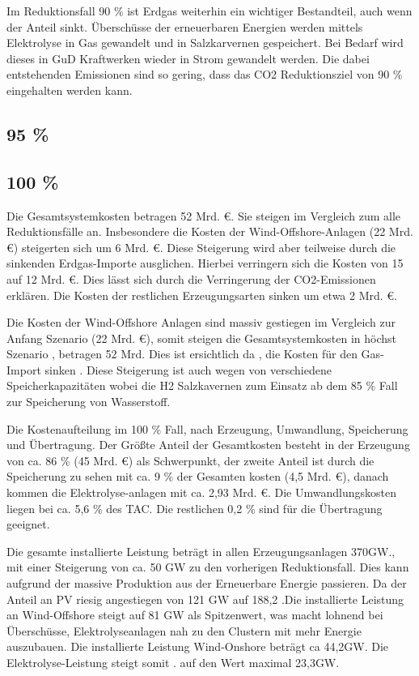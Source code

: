 Im Reduktionsfall 90 \% ist Erdgas weiterhin ein wichtiger Bestandteil, auch wenn der Anteil sinkt. Überschüsse der erneuerbaren Energien werden mittels Elektrolyse in Gas gewandelt und in Salzkarvernen gespeichert. Bei Bedarf wird dieses in GuD Kraftwerken wieder in Strom gewandelt werden. Die dabei entstehenden Emissionen sind so gering, dass das CO2 Reduktionsziel von 90 \% eingehalten werden kann. 

\subsection{95 \%}

\subsection{100 \%}
%
Die Gesamtsystemkosten betragen 52 Mrd. €. Sie steigen im Vergleich zum alle Reduktionsfälle an. Insbesondere die Kosten der Wind-Offshore-Anlagen (22 Mrd. €) steigerten sich um 6 Mrd. €. Diese Steigerung wird aber teilweise durch die sinkenden Erdgas-Importe ausglichen. Hierbei verringern sich die Kosten von 15 auf 12 Mrd. €. Dies lässt sich durch die Verringerung der CO2-Emissionen erklären. Die Kosten der restlichen Erzeugungsarten sinken um etwa 2 Mrd. €.

Die Kosten der Wind-Offshore Anlagen sind massiv gestiegen im Vergleich zur Anfang Szenario (22 Mrd. €), somit steigen die Gesamtsystemkosten in höchst Szenario , betragen 52 Mrd. Dies ist ersichtlich da , die Kosten für den Gas-Import sinken . Diese Steigerung  ist auch wegen von verschiedene Speicherkapazitäten wobei die H2 Salzkavernen zum Einsatz ab dem 85 \% Fall zur Speicherung von Wasserstoff.

Die Kostenaufteilung im 100 \% Fall, nach Erzeugung, Umwandlung, Speicherung und Übertragung. Der Größte Anteil der Gesamtkosten besteht in der Erzeugung von ca. 86 \% (45 Mrd. €) als Schwerpunkt, der zweite Anteil ist durch die Speicherung zu sehen mit ca. 9 \% der Gesamten kosten (4,5 Mrd. €), danach kommen die Elektrolyse-anlagen mit ca. 2,93 Mrd. €. Die Umwandlungskosten liegen bei ca. 5,6 \% des TAC. Die restlichen 0,2 \% sind für die Übertragung geeignet.

Die gesamte installierte Leistung beträgt in allen Erzeugungsanlagen 370GW., mit einer Steigerung von ca. 50 GW zu den vorherigen Reduktionsfall. Dies kann aufgrund der massive Produktion aus der Erneuerbare Energie passieren. Da der Anteil an PV riesig angestiegen von 121 GW auf 188,2 .Die installierte Leistung an Wind-Offshore steigt  auf 81 GW als Spitzenwert, was macht lohnend bei Überschüsse, Elektrolyseanlagen nah zu den Clustern mit mehr Energie auszubauen.  Die installierte Leistung Wind-Onshore beträgt ca 44,2GW. Die Elektrolyse-Leistung steigt somit . auf den Wert maximal  23,3GW.


